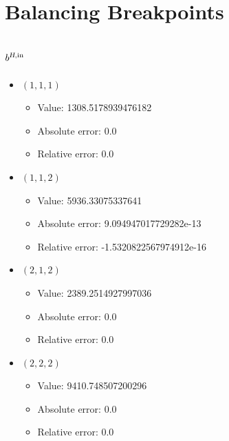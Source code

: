 \documentclass{article}%
\begin{document}
\section{Balancing Breakpoints}%
\subsection{$b^{\textsl{H},\text{in}}$}%
\begin{itemize}%
	\item $(1, 1, 1)$%
	\begin{itemize}%
		\item Value: 1308.5178939476182%
		\item Absolute error: 0.0%
		\item Relative error: 0.0%
	\end{itemize}%
	\item $(1, 1, 2)$%
	\begin{itemize}%
		\item Value: 5936.33075337641%
		\item Absolute error: 9.094947017729282e-13%
		\item Relative error: -1.5320822567974912e-16%
	\end{itemize}%
	\item $(2, 1, 2)$%
	\begin{itemize}%
		\item Value: 2389.2514927997036%
		\item Absolute error: 0.0%
		\item Relative error: 0.0%
	\end{itemize}%
	\item $(2, 2, 2)$%
	\begin{itemize}%
		\item Value: 9410.748507200296%
		\item Absolute error: 0.0%
		\item Relative error: 0.0%
	\end{itemize}%
\end{itemize}%
\end{document}
